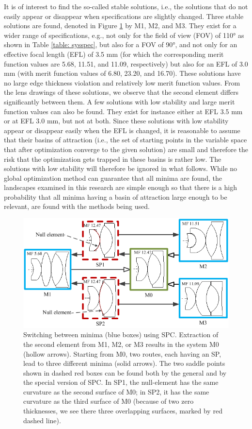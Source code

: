 It is of interest to find the so-called stable solutions, i.e., the solutions that do not easily appear or disappear when specifications are slightly changed. Three stable solutions are found, denoted in Figure \ref{fig:wideangleSwitch} by M1, M2, and M3. They exist for a wider range of specifications, e.g., not only for the field of view (FOV) of 110° as shown in Table \ref{table: sysspec}, but also for a FOV of 90°, and not only for an effective focal length (EFL) of 3.5 mm (for which the corresponding merit function values are 5.68, 11.51, and 11.09, respectively) but also for an EFL of 3.0 mm (with merit function values of 6.80, 23.20, and 16.70). These solutions have no large edge thickness violation and relatively low merit function values. From the lens drawings of these solutions, we observe that the second element differs significantly between them. A few solutions with low stability and large merit function values can also be found. They exist for instance either at EFL 3.5 mm or at EFL 3.0 mm, but not at both. Since these solutions with low stability appear or disappear easily when the EFL is changed, it is reasonable to assume that their basins of attraction (i.e., the set of starting points in the variable space that after optimization converge to the given solution) are small and therefore the risk that the optimization gets trapped in these basins is rather low. The solutions with low stability will therefore be ignored in what follows. While no global optimization method can guarantee that all minima are found, the landscapes examined in this research are simple enough so that there is a high probability that all minima having a basin of attraction large enough to be relevant, are found with the methods being used. 

\begin{figure}[h!]
    \centering
    \includegraphics[scale=0.6]{chapter-3/figures/WideAngleSwitch.png}
    \caption{Switching between minima (blue boxes) using SPC. Extraction of the second element from M1, M2, or M3 results in the system M0 (hollow arrows). Starting from M0, two routes, each having an SP, lead to three different minima (solid arrows). The two saddle points shown in dashed red boxes can be found both by the general and by the special version of SPC. In SP1, the null-element has the same curvature as the second surface of M0; in SP2, it has the same curvature as the third surface of M0 (because of two zero thicknesses, we see there three overlapping surfaces, marked by red dashed line).}
    \label{fig:wideangleSwitch}
\end{figure}

